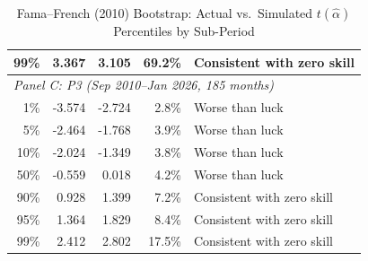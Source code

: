 \begin{table}[!htbp]
{\begin{tabular}[t]{rrrr>{\raggedright\arraybackslash}p{13em}}
\hspace{1em}99\% & 3.367 & 3.105 & 69.2\% & Consistent with zero skill\\
\hline
\multicolumn{5}{l}{\textit{Panel C: P3 (Sep 2010--Jan 2026, 185 months)}}\\
\hspace{1em}1\% & -3.574 & -2.724 & 2.8\% & Worse than luck\\
\hspace{1em}5\% & -2.464 & -1.768 & 3.9\% & Worse than luck\\
\hspace{1em}10\% & -2.024 & -1.349 & 3.8\% & Worse than luck\\
\hspace{1em}50\% & -0.559 & 0.018 & 4.2\% & Worse than luck\\
\hspace{1em}90\% & 0.928 & 1.399 & 7.2\% & Consistent with zero skill\\
\hspace{1em}95\% & 1.364 & 1.829 & 8.4\% & Consistent with zero skill\\
\hspace{1em}99\% & 2.412 & 2.802 & 17.5\% & Consistent with zero skill\\
\bottomrule
\end{tabular}%
}\sbefit
\setlength{\tabletempwidth}{\wd\tabletempbox}
\ifdim\tabletempwidth>\linewidth\setlength{\tabletempwidth}{\linewidth}\fi
\begin{minipage}{\tabletempwidth}
\captionsetup{width=\linewidth}
\caption{\label{tab:subperiod_bootstrap_tails}Fama--French (2010) Bootstrap: Actual vs.\ Simulated $t(\hat{\alpha})$ Percentiles by Sub-Period}
\ifdim\wd\tabletempbox>\linewidth
  \resizebox{\linewidth}{!}{\usebox{\tabletempbox}}
\else
  \usebox{\tabletempbox}
\fi
\par\medskip
\begin{singlespace}\tablefont\noindent

\end{singlespace}
\end{minipage}
\end{table}
